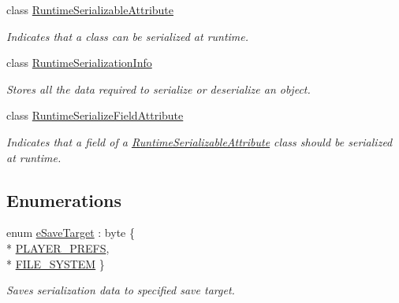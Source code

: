 \begin{DoxyCompactItemize}
class \hyperlink{class_voxel_busters_1_1_runtime_serialization_1_1_runtime_serializable_attribute}{Runtime\+Serializable\+Attribute}
\begin{DoxyCompactList}\small\item\em Indicates that a class can be serialized at runtime. \end{DoxyCompactList}\item 
class \hyperlink{class_voxel_busters_1_1_runtime_serialization_1_1_runtime_serialization_info}{Runtime\+Serialization\+Info}
\begin{DoxyCompactList}\small\item\em Stores all the data required to serialize or deserialize an object. \end{DoxyCompactList}\item 
class \hyperlink{class_voxel_busters_1_1_runtime_serialization_1_1_runtime_serialize_field_attribute}{Runtime\+Serialize\+Field\+Attribute}
\begin{DoxyCompactList}\small\item\em Indicates that a field of a \hyperlink{class_voxel_busters_1_1_runtime_serialization_1_1_runtime_serializable_attribute}{Runtime\+Serializable\+Attribute} class should be serialized at runtime. \end{DoxyCompactList}\end{DoxyCompactItemize}
\subsection*{Enumerations}
\begin{DoxyCompactItemize}
\item 
enum \hyperlink{namespace_voxel_busters_1_1_runtime_serialization_aacaa3008b2cb441fbe4708df854019bf}{e\+Save\+Target} \+: byte \{ \\*
\hyperlink{namespace_voxel_busters_1_1_runtime_serialization_aacaa3008b2cb441fbe4708df854019bfa4cc629b75d0db85993aaa1ceab89775e}{P\+L\+A\+Y\+E\+R\+\_\+\+P\+R\+E\+F\+S}, 
\\*
\hyperlink{namespace_voxel_busters_1_1_runtime_serialization_aacaa3008b2cb441fbe4708df854019bfa47859e0cd44b283c0b013bb759600bf7}{F\+I\+L\+E\+\_\+\+S\+Y\+S\+T\+E\+M}
 \}
\begin{DoxyCompactList}\small\item\em Saves serialization data to specified save target. \end{DoxyCompactList}\end{DoxyCompactItemize}


